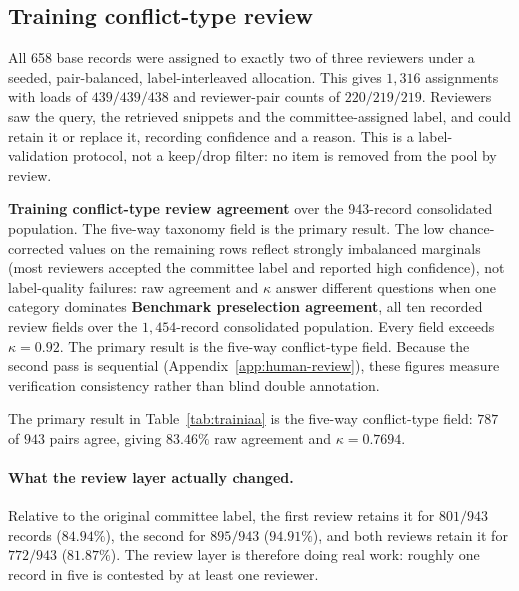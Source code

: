 \subsection{Training conflict-type review}

All 658 base records were assigned to exactly two of three reviewers under a
seeded, pair-balanced, label-interleaved allocation. This gives $1{,}316$ assignments
with loads of $439/439/438$ and reviewer-pair counts of $220/219/219$. Reviewers
saw the query, the retrieved snippets and the committee-assigned label, and could
retain it or replace it, recording confidence and a reason. This is a
label-validation protocol, not a keep/drop filter: no item is removed from the
pool by review.

\begin{table}[htbp]
\centering
\begin{minipage}[t]{0.47\linewidth}\vspace{0pt}
\centering

\end{minipage}%
\hspace{0.03\linewidth}%
\begin{minipage}[t]{0.47\linewidth}\vspace{0pt}
\centering

\end{minipage}
%
{\textbf{Training conflict-type review agreement} over the 943-record consolidated population. The five-way taxonomy field is the primary result. The low chance-corrected values on the remaining rows reflect strongly imbalanced marginals (most reviewers accepted the committee label and reported high confidence), not label-quality failures: raw agreement and $\kappa$ answer different questions when one category dominates}%
{\textbf{Benchmark preselection agreement}, all ten recorded review fields over the $1{,}454$-record consolidated population. Every field exceeds $\kappa=0.92$. The primary result is the five-way conflict-type field. Because the second pass is sequential (Appendix~\ref{app:human-review}), these figures measure verification consistency rather than blind double annotation.}
\end{table}

The primary result in Table~\ref{tab:trainiaa} is the five-way conflict-type
field: $787$ of $943$ pairs agree, giving $83.46\%$ raw agreement and
$\kappa=0.7694$.

\paragraph{What the review layer actually changed.} Relative to the original
committee label, the first review retains it for $801/943$ records ($84.94\%$),
the second for $895/943$ ($94.91\%$), and both reviews retain it for $772/943$
($81.87\%$). The review layer is therefore doing real work: roughly one record in
five is contested by at least one reviewer.

